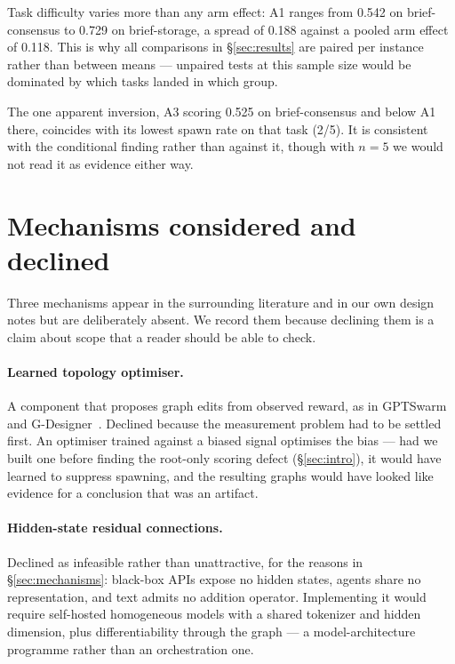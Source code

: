 \documentclass[10pt]{article}
\begin{document}
Task difficulty varies more than any arm effect: A1 ranges from 0.542 on
brief-consensus to 0.729 on brief-storage, a spread of 0.188 against a pooled
arm effect of 0.118. This is why all comparisons in §\ref{sec:results} are
paired per instance rather than between means --- unpaired tests at this sample
size would be dominated by which tasks landed in which group.

The one apparent inversion, A3 scoring 0.525 on brief-consensus and below A1
there, coincides with its lowest spawn rate on that task (2/5). It is consistent
with the conditional finding rather than against it, though with $n = 5$ we
would not read it as evidence either way.

\section{Mechanisms considered and declined}
\label{app:declined}

Three mechanisms appear in the surrounding literature and in our own design
notes but are deliberately absent. We record them because declining them is a
claim about scope that a reader should be able to check.

\paragraph{Learned topology optimiser.}
A component that proposes graph edits from observed reward, as in
GPTSwarm~\citep{zhuge2024gptswarm} and G-Designer~\citep{zhang2024gdesigner}.
Declined because the measurement problem had to be settled first. An optimiser
trained against a biased signal optimises the bias --- had we built one before
finding the root-only scoring defect (§\ref{sec:intro}), it would have learned
to suppress spawning, and the resulting graphs would have looked like evidence
for a conclusion that was an artifact.

\paragraph{Hidden-state residual connections.}
Declined as infeasible rather than unattractive, for the reasons in
§\ref{sec:mechanisms}: black-box APIs expose no hidden states, agents share no
representation, and text admits no addition operator. Implementing it would
require self-hosted homogeneous models with a shared tokenizer and hidden
dimension, plus differentiability through the graph --- a model-architecture
programme rather than an orchestration one.
\end{document}

